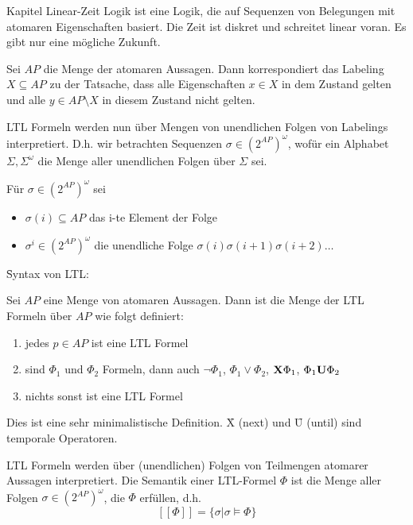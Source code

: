 \begin{chapter}{Kapitel}
\noindent Linear-Zeit Logik ist eine Logik, die auf Sequenzen von Belegungen mit atomaren Eigenschaften basiert. Die Zeit ist diskret und schreitet linear voran. Es gibt 
nur eine mögliche Zukunft.
\vspace*{4pt}

\noindent Sei $AP$ die Menge der atomaren Aussagen. Dann korrespondiert das Labeling $X \subseteq AP$ zu der Tatsache, dass alle Eigenschaften $x\in X$ in dem 
Zustand gelten und alle $y\in AP\setminus X$ in diesem Zustand nicht gelten.

\noindent LTL Formeln werden nun über Mengen von unendlichen Folgen von Labelings interpretiert. D.h. wir betrachten Sequenzen $\sigma \in (2^{AP})^\omega$, wofür
ein Alphabet $\Sigma, \Sigma^\omega$ die Menge aller unendlichen Folgen über $\Sigma$ sei. 

\noindent Für $\sigma \in (2^{AP})^\omega$ sei 
\begin{itemize}
 \item $\sigma(i) \subseteq AP$ das i-te Element der Folge
 \item $\sigma^i \in (2^{AP})^\omega$ die unendliche Folge $\sigma(i)\sigma(i+1)\sigma(i+2)\dots$
\end{itemize}
\vspace*{5pt}

\f{Syntax von LTL}:
\vspace*{4pt}

\noindent Sei $AP$ eine Menge von atomaren Aussagen. Dann ist die Menge der LTL Formeln über $AP$ wie folgt definiert: 
\begin{enumerate}
 \item jedes $p\in AP$ ist eine LTL Formel 
 \item sind $\Phi_1$ und $\Phi_2$ Formeln, dann auch $\neg \Phi_1$, $\Phi_1 \vee \Phi_2$, $\f{X}\Phi_1$, $\Phi_1\f{U}\Phi_2$
 \item nichts sonst ist eine LTL Formel 
\end{enumerate}

\noindent Dies ist eine sehr minimalistische Definition. \f{X} (next) und \f{U} (until) sind temporale Operatoren. 
\vspace*{4pt}

\noindent LTL Formeln werden über (unendlichen) Folgen von Teilmengen atomarer Aussagen interpretiert. Die Semantik einer LTL-Formel $\Phi$ ist die Menge aller 
Folgen $\sigma \in (2^{AP})^\omega$, die $\Phi$ erfüllen, d.h. 
\[[[\Phi]] = \{\sigma | \sigma \vDash \Phi\}\]


\end{chapter}
